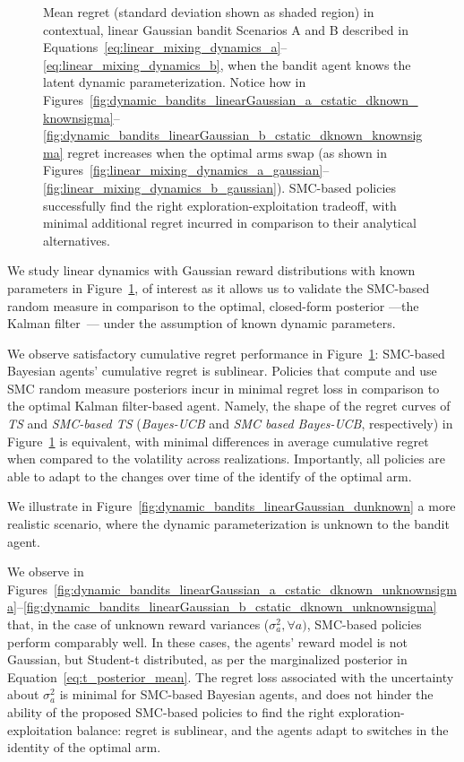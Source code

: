 \begin{figure}[!h]
	\caption{
		Mean regret (standard deviation shown as shaded region) in contextual, linear Gaussian bandit Scenarios A and B
		described in Equations~\eqref{eq:linear_mixing_dynamics_a}--\eqref{eq:linear_mixing_dynamics_b},
		when the bandit agent knows the latent dynamic parameterization.
		Notice how
		in Figures~\ref{fig:dynamic_bandits_linearGaussian_a_cstatic_dknown_knownsigma}--\ref{fig:dynamic_bandits_linearGaussian_b_cstatic_dknown_knownsigma}
		regret increases when the optimal arms swap
		(as shown in Figures~\ref{fig:linear_mixing_dynamics_a_gaussian}--\ref{fig:linear_mixing_dynamics_b_gaussian}).
		SMC-based policies successfully find the right exploration-exploitation tradeoff,
		with minimal additional regret incurred in comparison to their analytical alternatives. 
	}
	\label{fig:dynamic_bandits_linearGaussian_dknown}
\end{figure}

We study linear dynamics with Gaussian reward distributions with known parameters in Figure~\ref{fig:dynamic_bandits_linearGaussian_dknown},
of interest as it allows us to validate the SMC-based random measure in comparison to the optimal, closed-form posterior
---the Kalman filter~\cite{j-Kalman1960}---
under the assumption of known dynamic parameters.

We observe satisfactory cumulative regret performance in Figure~\ref{fig:dynamic_bandits_linearGaussian_dknown}:
\ie SMC-based Bayesian agents' cumulative regret is sublinear.
Policies that compute and use SMC random measure posteriors
incur in minimal regret loss 
in comparison to the optimal Kalman filter-based agent.
Namely, the shape of the regret curves of \textit{TS} and \textit{SMC-based TS}
(\textit{Bayes-UCB} and \textit{SMC based Bayes-UCB}, respectively) in Figure~\ref{fig:dynamic_bandits_linearGaussian_dknown} is equivalent,
with minimal differences in average cumulative regret when compared to the volatility across realizations.
Importantly, all policies are able to adapt to the changes over time of the identify of the optimal arm. 

We illustrate in Figure~\ref{fig:dynamic_bandits_linearGaussian_dunknown}
a more realistic scenario, where the dynamic parameterization is unknown to the bandit agent.

We observe in Figures~\ref{fig:dynamic_bandits_linearGaussian_a_cstatic_dknown_unknownsigma}--\ref{fig:dynamic_bandits_linearGaussian_b_cstatic_dknown_unknownsigma} that,
in the case of unknown reward variances ($\sigma_a^2, \forall a)$,
SMC-based policies perform comparably well.
In these cases,
the agents' reward model is not Gaussian,
but Student-t distributed, as per the marginalized posterior in Equation~\eqref{eq:t_posterior_mean}.
The regret loss associated with the uncertainty about $\sigma_a^2$ is minimal for SMC-based Bayesian agents,
and does not hinder the ability of the proposed SMC-based policies
to find the right exploration-exploitation balance:
\ie regret is sublinear, and the agents adapt to switches in the identity of the optimal arm.

